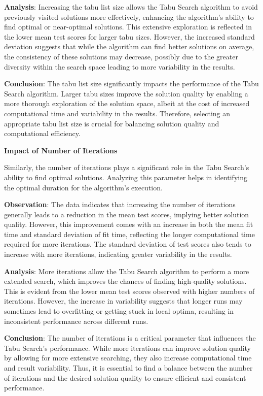 \documentclass{article}
\begin{document}
    \textbf{Analysis}: Increasing the tabu list size allows the Tabu Search algorithm to avoid previously visited solutions more effectively, enhancing the algorithm's ability to find optimal or near-optimal solutions. This extensive exploration is reflected in the lower mean test scores for larger tabu sizes. However, the increased standard deviation suggests that while the algorithm can find better solutions on average, the consistency of these solutions may decrease, possibly due to the greater diversity within the search space leading to more variability in the results.

    \textbf{Conclusion}: The tabu list size significantly impacts the performance of the Tabu Search algorithm. Larger tabu sizes improve the solution quality by enabling a more thorough exploration of the solution space, albeit at the cost of increased computational time and variability in the results. Therefore, selecting an appropriate tabu list size is crucial for balancing solution quality and computational efficiency.

    \textbf{Impact of Number of Iterations}

    Similarly, the number of iterations plays a significant role in the Tabu Search's ability to find optimal solutions. Analyzing this parameter helps in identifying the optimal duration for the algorithm’s execution.

    \textbf{Observation}: The data indicates that increasing the number of iterations generally leads to a reduction in the mean test scores, implying better solution quality. However, this improvement comes with an increase in both the mean fit time and standard deviation of fit time, reflecting the longer computational time required for more iterations. The standard deviation of test scores also tends to increase with more iterations, indicating greater variability in the results.

    \textbf{Analysis}: More iterations allow the Tabu Search algorithm to perform a more extended search, which improves the chances of finding high-quality solutions. This is evident from the lower mean test scores observed with higher numbers of iterations. However, the increase in variability suggests that longer runs may sometimes lead to overfitting or getting stuck in local optima, resulting in inconsistent performance across different runs.

    \textbf{Conclusion}: The number of iterations is a critical parameter that influences the Tabu Search's performance. While more iterations can improve solution quality by allowing for more extensive searching, they also increase computational time and result variability. Thus, it is essential to find a balance between the number of iterations and the desired solution quality to ensure efficient and consistent performance.
\end{document}
